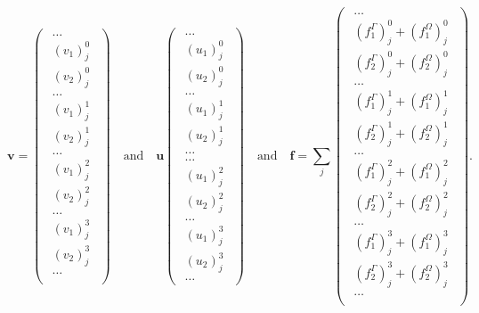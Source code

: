 \begin{equation}
    \mathbf{v} = 
    \begin{pmatrix}
    \begin{smallmatrix}
        \dots \\ (v_1)^0_j \\ (v_2)^0_j \\ \dots \\ (v_1)^1_j \\ (v_2)^1_j \\ \dots \\ (v_1)^2_j \\ (v_2)^2_j \\ \dots \\ (v_1)^3_j \\ (v_2)^3_j \\ \dots \\
    \end{smallmatrix}
    \end{pmatrix}
    \quad
    \text{and}
    \quad
    \mathbf{u}
    \begin{pmatrix}
    \begin{smallmatrix}
        \dots \\ (u_1)^0_j \\ (u_2)^0_j \\ \dots \\ (u_1)^1_j \\ (u_2)^1_j \\ \dots \\
        \dots \\ (u_1)^2_j \\ (u_2)^2_j \\ \dots \\ (u_1)^3_j \\ (u_2)^3_j \\ \dots
    \end{smallmatrix}
    \end{pmatrix}
    \quad
    \text{and}
    \quad
    \mathbf{f} = 
    \sum_j
    \begin{pmatrix}
    \begin{smallmatrix}
        \dots \\ (f^\Gamma_1)^0_j + (f^\Omega_1)^0_j \\ (f^\Gamma_2)^0_j + (f^\Omega_2)^0_j \\ \dots \\ (f^\Gamma_1)^1_j + (f^\Omega_1)^1_j \\ (f^\Gamma_2)^1_j + (f^\Omega_2)^1_j\\ \dots \\ (f^\Gamma_1)^2_j + (f^\Omega_1)^2_j \\ (f^\Gamma_2)^2_j + (f^\Omega_2)^2_j \\ \dots \\ (f^\Gamma_1)^3_j + (f^\Omega_1)^3_j \\ (f^\Gamma_2)^3_j + (f^\Omega_2)^3_j \\ \dots \\
    \end{smallmatrix}
    \end{pmatrix}.
\end{equation}
